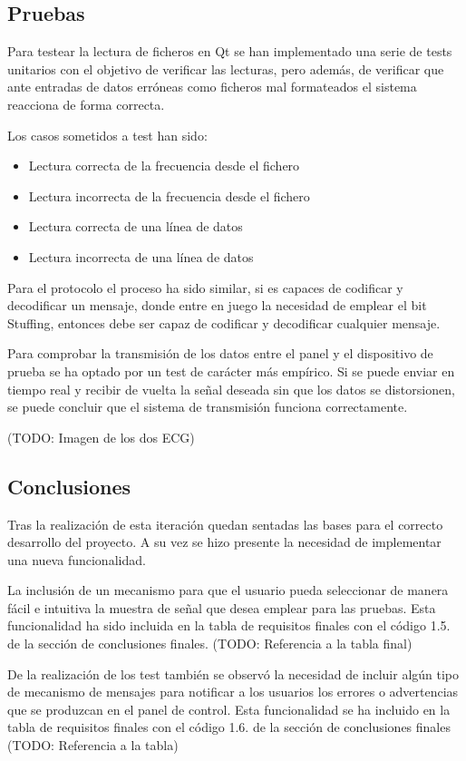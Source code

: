     \subsection{Pruebas}

        Para testear la lectura de ficheros en Qt se han implementado una serie de tests unitarios con el objetivo de verificar las lecturas, pero además, de verificar que ante entradas de datos erróneas como ficheros mal formateados el sistema reacciona de forma correcta.

        Los casos sometidos a test han sido:

        \begin{itemize}
                \item Lectura correcta de la frecuencia desde el fichero
                \item Lectura incorrecta de la frecuencia desde el fichero
                \item Lectura correcta de una línea de datos
                \item Lectura incorrecta de una línea de datos
        \end{itemize}

        Para el protocolo el proceso ha sido similar, si es capaces de codificar y decodificar un mensaje, donde entre en juego la necesidad de emplear el bit Stuffing, entonces debe ser capaz de codificar y decodificar cualquier mensaje.

        Para comprobar la transmisión de los datos entre el panel y el dispositivo de prueba se ha optado por un test de carácter más empírico. Si se puede enviar en tiempo real y recibir de vuelta la señal deseada sin que los datos se distorsionen, se puede concluir que el sistema de transmisión funciona correctamente.

        (TODO: Imagen de los dos ECG)


    \subsection{Conclusiones}

        Tras la realización de esta iteración quedan sentadas las bases para el correcto desarrollo del proyecto. A su vez se hizo presente la necesidad de implementar una nueva funcionalidad.

        La inclusión de un mecanismo para que el usuario pueda seleccionar de manera fácil e intuitiva la muestra de señal que desea emplear para las pruebas. Esta funcionalidad ha sido incluida en la tabla de requisitos finales con el código 1.5. de la sección de conclusiones finales. (TODO: Referencia a la tabla final)

        De la realización de los test también se observó la necesidad de incluir algún tipo de mecanismo de mensajes para notificar a los usuarios los errores o advertencias que se produzcan en el panel de control. Esta funcionalidad se ha incluido en la tabla de requisitos finales con el código 1.6. de la sección de conclusiones finales (TODO: Referencia a la tabla)
        
